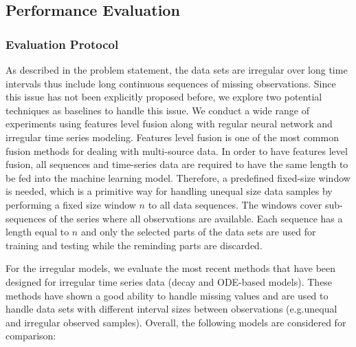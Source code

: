 \documentclass[conference]{IEEEtran}
\begin{document}
\subsection{Performance Evaluation}
\subsubsection{Evaluation Protocol}
As described in the problem statement, the data sets are irregular over long time intervals thus include long continuous sequences of missing observations. Since this issue has not been explicitly proposed before, we explore two potential techniques as baselines to handle this issue. We conduct a wide range of experiments using features level fusion along with regular neural network and irregular time series modeling. Features level fusion is one of the most common fusion methods for dealing with multi-source data. In order to have features level fusion, all sequences and time-series data are required to have the same length to be fed into the machine learning model. Therefore, a predefined fixed-size window is needed, which is a primitive way for handling unequal size data samples by performing a fixed size window $n$ to all data sequences. The windows cover sub-sequences of the series where all observations are available. Each sequence has a length equal to $n$ and only the selected parts of the data sets are used for training and testing while the reminding parts are discarded.

For the irregular models, we evaluate the most recent methods that have been designed for irregular time series data (decay and ODE-based models). These methods have shown a good ability to handle missing values and are used to handle data sets with different interval sizes between observations (e.g.unequal and irregular observed samples). Overall, the following models are considered for comparison:

\end{document}
